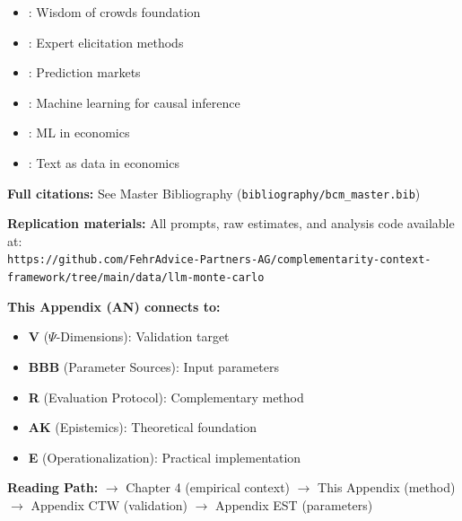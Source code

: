 \begin{itemize}[nosep]
    \item \citet{surowiecki2005wisdom}: Wisdom of crowds foundation
    \item \citet{ohaganelicitation}: Expert elicitation methods
    \item \citet{wolfers2004prediction}: Prediction markets
    \item \citet{atheyimbens2019}: Machine learning for causal inference
    \item \citet{mullainathan2017}: ML in economics
    \item \citet{gentzkow2019}: Text as data in economics
\end{itemize}

\textbf{Full citations:} See Master Bibliography (\texttt{bibliography/bcm\_master.bib})

\textbf{Replication materials:} All prompts, raw estimates, and analysis code available at:\\
\texttt{https://github.com/FehrAdvice-Partners-AG/complementarity-context-framework/tree/main/data/llm-monte-carlo}


\begin{tcolorbox}[colback=gray!10!white, colframe=gray!75!black,
    title=\textbf{Cross-Reference Footer}]
\label{sec:AN-footer}

\textbf{This Appendix (AN) connects to:}
\begin{itemize}[nosep]
    \item \textbf{V} ($\Psi$-Dimensions): Validation target
    \item \textbf{BBB} (Parameter Sources): Input parameters
    \item \textbf{R} (Evaluation Protocol): Complementary method
    \item \textbf{AK} (Epistemics): Theoretical foundation
    \item \textbf{E} (Operationalization): Practical implementation
\end{itemize}

\textbf{Reading Path:}
$\rightarrow$ Chapter 4 (empirical context) $\rightarrow$ This Appendix (method)
$\rightarrow$ Appendix CTW (validation) $\rightarrow$ Appendix EST (parameters)

\end{tcolorbox}
